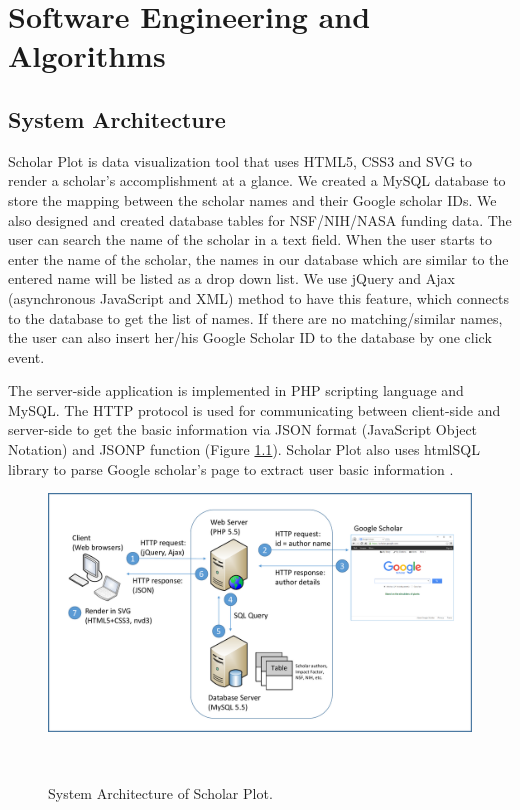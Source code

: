 \chapter{Software Engineering and Algorithms}\label{chap:Algorithms}
\section{System Architecture}
Scholar Plot is data visualization tool that uses HTML5, CSS3 and SVG to render a scholar's accomplishment at a glance. We created a MySQL database to store the mapping between the scholar names and their Google scholar IDs. We also designed and created database tables for NSF/NIH/NASA funding data. The user can search the name of the scholar in a text field. When the user starts to enter the name of the scholar, the names in our database which are similar to the entered name will be listed as a drop down list. We use jQuery and Ajax (asynchronous JavaScript and XML) method to have this feature, which connects to the database to get the list of names. If there are no matching/similar names, the user can also insert her/his Google Scholar ID to the database by one click event.

The server-side application is implemented in PHP scripting language and MySQL. The HTTP protocol is used for communicating between client-side and server-side to get the basic information via JSON format (JavaScript Object Notation) and JSONP function (Figure \ref{fig:fig-arch}). Scholar Plot also uses htmlSQL library to parse Google scholar's page to extract user basic information \cite{htmlSQL}.

\begin{figure}
\centering
  \includegraphics[width=1\columnwidth]{figures/fig_system_architecture.pdf}
  \caption{System Architecture of Scholar Plot.}~\label{fig:fig-arch}
\end{figure}


